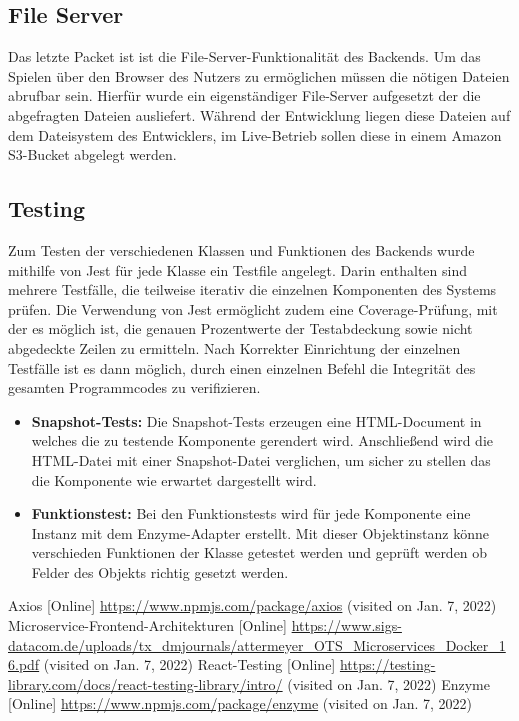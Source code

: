\documentclass[conference]{IEEEtran}
\begin{document}
\subsection{File Server}
Das letzte Packet ist ist die File-Server-Funktionalität des Backends. Um das Spielen über den Browser des Nutzers zu ermöglichen müssen die nötigen Dateien abrufbar sein. Hierfür wurde ein eigenständiger File-Server aufgesetzt der die abgefragten Dateien ausliefert. Während der Entwicklung liegen diese Dateien auf dem Dateisystem des Entwicklers, im Live-Betrieb sollen diese in einem Amazon S3-Bucket abgelegt werden.

\subsection{Testing}
Zum Testen der verschiedenen Klassen und Funktionen des Backends wurde mithilfe von Jest für jede Klasse ein Testfile angelegt. Darin enthalten sind mehrere Testfälle, die teilweise iterativ die einzelnen Komponenten des Systems prüfen. Die Verwendung von Jest ermöglicht zudem eine Coverage-Prüfung, mit der es möglich ist, die genauen Prozentwerte der Testabdeckung sowie nicht abgedeckte Zeilen zu ermitteln. Nach Korrekter Einrichtung der einzelnen Testfälle ist es dann möglich, durch einen einzelnen Befehl die Integrität des gesamten Programmcodes zu verifizieren.

\begin{itemize}
    \item \textbf{Snapshot-Tests:}
    Die Snapshot-Tests erzeugen eine HTML-Document in welches die zu testende Komponente gerendert wird.
    Anschließend wird die HTML-Datei mit einer Snapshot-Datei verglichen, um sicher zu stellen das die Komponente wie erwartet dargestellt wird.
    \item \textbf{Funktionstest:}
    Bei den Funktionstests wird für jede Komponente eine Instanz mit dem Enzyme-Adapter erstellt.
    Mit dieser Objektinstanz könne verschieden Funktionen der Klasse getestet werden und geprüft werden ob Felder des Objekts richtig gesetzt werden.
\end{itemize}



\begin{thebibliography}{0}
	Axios [Online] \url{https://www.npmjs.com/package/axios} (visited on Jan. 7, 2022)
    Microservice-Frontend-Architekturen [Online] \url{https://www.sigs-datacom.de/uploads/tx_dmjournals/attermeyer_OTS_Microservices_Docker_16.pdf} (visited on Jan. 7, 2022)
    React-Testing [Online] \url{https://testing-library.com/docs/react-testing-library/intro/} (visited on Jan. 7, 2022)
    Enzyme [Online] \url{https://www.npmjs.com/package/enzyme} (visited on Jan. 7, 2022)  
\end{thebibliography}
\end{document}
